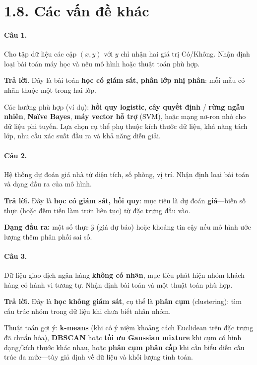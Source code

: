 \section*{1.8. Các vấn đề khác}

\paragraph{Câu 1.} Cho tập dữ liệu các cặp $(x,y)$ với $y$ chỉ nhận hai giá trị Có/Không. Nhận định loại bài toán máy học và nêu mô hình hoặc thuật toán phù hợp.

\medskip\noindent\textbf{Trả lời.} Đây là bài toán \textbf{học có giám sát, phân lớp nhị phân}: mỗi mẫu có nhãn thuộc một trong hai lớp.

Các hướng phù hợp (ví dụ): \textbf{hồi quy logistic}, \textbf{cây quyết định} / \textbf{rừng ngẫu nhiên}, \textbf{Naïve Bayes}, \textbf{máy vector hỗ trợ} (SVM), hoặc mạng nơ-ron nhỏ cho dữ liệu phi tuyến. Lựa chọn cụ thể phụ thuộc kích thước dữ liệu, khả năng tách lớp, nhu cầu xác suất đầu ra và khả năng diễn giải.

\paragraph{Câu 2.} Hệ thống dự đoán giá nhà từ diện tích, số phòng, vị trí. Nhận định loại bài toán và dạng đầu ra của mô hình.

\medskip\noindent\textbf{Trả lời.} Đây là \textbf{học có giám sát, hồi quy}: mục tiêu là dự đoán \textbf{giá}---biến số thực (hoặc đếm tiền làm trơn liên tục) từ đặc trưng đầu vào.

\textbf{Dạng đầu ra:} một số thực $\hat{y}$ (giá dự báo) hoặc khoảng tin cậy nếu mô hình ước lượng thêm phân phối sai số.

\paragraph{Câu 3.} Dữ liệu giao dịch ngân hàng \textbf{không có nhãn}, mục tiêu phát hiện nhóm khách hàng có hành vi tương tự. Nhận định bài toán và một thuật toán phù hợp.

\medskip\noindent\textbf{Trả lời.} Đây là \textbf{học không giám sát}, cụ thể là \textbf{phân cụm} (clustering): tìm cấu trúc nhóm trong dữ liệu khi chưa biết nhãn nhóm.

Thuật toán gợi ý: \textbf{k-means} (khi có ý niệm khoảng cách Euclidean trên đặc trưng đã chuẩn hóa), \textbf{DBSCAN} hoặc \textbf{tối ưu Gaussian mixture} khi cụm có hình dạng/kích thước khác nhau, hoặc \textbf{phân cụm phân cấp} khi cần biểu diễn cấu trúc đa mức---tùy giả định về dữ liệu và khối lượng tính toán.

